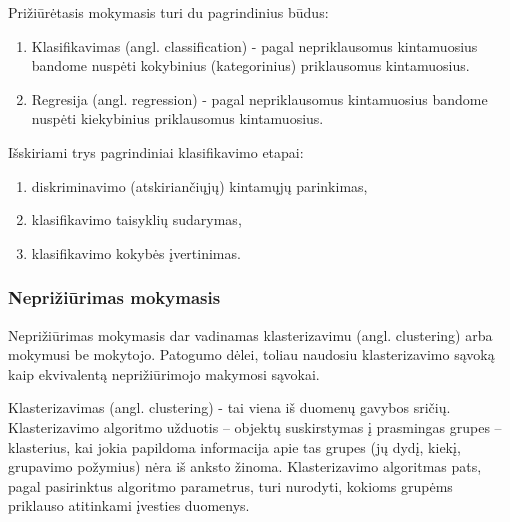 Prižiūrėtasis mokymasis turi du pagrindinius būdus:
\begin{enumerate}
  \item Klasifikavimas (angl. classification) - pagal nepriklausomus
  kintamuosius bandome nuspėti kokybinius (kategorinius) priklausomus kintamuosius. 
  \item Regresija (angl. regression) - pagal nepriklausomus kintamuosius bandome
  nuspėti kiekybinius priklausomus kintamuosius.
\end{enumerate}

Išskiriami trys pagrindiniai klasifikavimo etapai:
\begin{enumerate}
  \item diskriminavimo (atskiriančiųjų) kintamųjų parinkimas,
  \item klasifikavimo taisyklių sudarymas,
  \item klasifikavimo kokybės įvertinimas.
\end{enumerate}



\subsubsection{Neprižiūrimas mokymasis}

Neprižiūrimas mokymasis dar vadinamas klasterizavimu (angl. clustering) arba
mokymusi be mokytojo. Patogumo dėlei, toliau naudosiu klasterizavimo sąvoką kaip
ekvivalentą neprižiūrimojo makymosi sąvokai.


Klasterizavimas (angl.  clustering) - tai viena iš duomenų gavybos sričių. Klasterizavimo 
algoritmo užduotis – objektų suskirstymas  į prasmingas 
grupes – klasterius, kai jokia papildoma informacija apie tas grupes (jų dydį, kiekį, grupavimo požymius) nėra iš anksto žinoma.
%
% 
Klasterizavimo algoritmas pats, pagal pasirinktus algoritmo parametrus, turi nurodyti, kokioms 
grupėms priklauso atitinkami įvesties duomenys.\cite{martisiute08}


